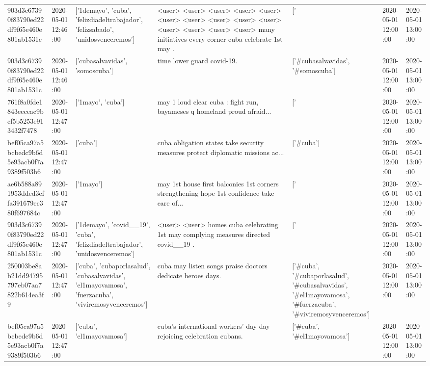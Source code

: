 \begin{tabular}{lllllll}
903d3c67390f83790ed22df9f65e460e801ab1531c & 2020-05-01 12:46:00 & ['1demayo', 'cuba', 'felizdiadeltrabajador', 'felizsabado', 'unidosvenceremos'] & <user> <user> <user> <user> <user> <user> <user> <user> <user> <user> <user> <user> <user> <user> many initiatives every corner cuba celebrate 1st may . & ['#1demayo', '#cuba', '#felizdiadeltrabajador', '#unidosvenceremos'] & 2020-05-01 12:00:00 & 2020-05-01 13:00:00 \\
903d3c67390f83790ed22df9f65e460e801ab1531c & 2020-05-01 12:46:00 & ['cubasalvavidas', 'somoscuba'] & time lower guard covid-19. & ['#cubasalvavidas', '#somoscuba'] & 2020-05-01 12:00:00 & 2020-05-01 13:00:00 \\
761f8a0fde1843eeceac9bcf5b5253e913432f7478 & 2020-05-01 12:47:00 & ['1mayo', 'cuba'] & may 1 loud clear cuba : fight run, bayameses q homeland proud afraid... & ['#1mayo', '#cuba'] & 2020-05-01 12:00:00 & 2020-05-01 13:00:00 \\
bef05ca97a5bcbedc9b6d5e93acb0f7a9389f503b6 & 2020-05-01 12:47:00 & ['cuba'] & cuba obligation states take security measures protect diplomatic missions ac... & ['#cuba'] & 2020-05-01 12:00:00 & 2020-05-01 13:00:00 \\
ae6b588a891953dded3effa391679ec380f697684c & 2020-05-01 12:47:00 & ['1mayo'] & may 1st house first balconies 1st corners strengthening hope 1st confidence take care of... & ['#1mayo'] & 2020-05-01 12:00:00 & 2020-05-01 13:00:00 \\
903d3c67390f83790ed22df9f65e460e801ab1531c & 2020-05-01 12:47:00 & ['1demayo', 'covid__19', 'cuba', 'felizdiadeltrabajador', 'unidosvenceremos'] & <user> <user> homes cuba celebrating 1st may complying measures directed covid\_\_19 . & ['#1demayo', '#covid__19', '#cuba', '#felizdiadeltrabajador', '#unidosvenceremos'] & 2020-05-01 12:00:00 & 2020-05-01 13:00:00 \\
250003be8ab21dd94795797eb07aa7822b614ea3f9 & 2020-05-01 12:47:00 & ['cuba', 'cubaporlasalud', 'cubasalvavidas', 'el1mayovamosa', 'fuerzacuba', 'viviremosyvenceremos'] & cuba may listen songs praise doctors dedicate heroes days. & ['#cuba', '#cubaporlasalud', '#cubasalvavidas', '#el1mayovamosa', '#fuerzacuba', '#viviremosyvenceremos'] & 2020-05-01 12:00:00 & 2020-05-01 13:00:00 \\
bef05ca97a5bcbedc9b6d5e93acb0f7a9389f503b6 & 2020-05-01 12:47:00 & ['cuba', 'el1mayovamosa'] & cuba's international workers' day day rejoicing celebration cubans. & ['#cuba', '#el1mayovamosa'] & 2020-05-01 12:00:00 & 2020-05-01 13:00:00 \\

\end{tabular}
